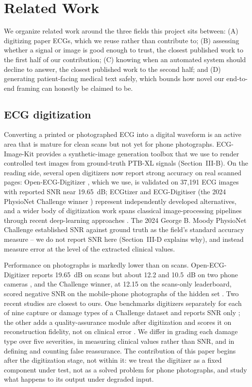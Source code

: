 \documentclass[conference]{IEEEtran}
\begin{document}
\section{Related Work}

We organize related work around the three fields this project sits between: (A)
digitizing paper ECGs, which we reuse rather than contribute to; (B) assessing
whether a signal or image is good enough to trust, the closest published work to the
first half of our contribution; (C) knowing when an automated system should decline
to answer, the closest published work to the second half; and (D) generating
patient-facing medical text safely, which bounds how novel our end-to-end framing can
honestly be claimed to be.

\subsection{ECG digitization}

Converting a printed or photographed ECG into a digital waveform is an active area
that is mature for clean scans but not yet for phone photographs. ECG-Image-Kit \cite{ref1} provides a synthetic-image
generation toolbox that we use to render controlled test images from ground-truth
PTB-XL signals (Section~III-B). On the reading side, several open digitizers now
report strong accuracy on real scanned pages: Open-ECG-Digitizer \cite{ref5}, which we
use, is validated on 37{,}191 ECG images with reported SNR near 19.65~dB;
ECGtizer \cite{ref3} and ECG-Digitiser (the 2024 PhysioNet Challenge
winner \cite{ref53}) represent independently developed alternatives, and a wider
body of digitization work spans classical image-processing
pipelines \cite{ref6,ref7,ref8,ref9} through recent deep-learning
approaches \cite{ref10,ref11}. The 2024 George B. Moody PhysioNet Challenge
established SNR against ground truth as the field's standard accuracy
measure \cite{ref2,ref4} -- we do not report SNR here (Section~III-D explains why),
and instead measure error at the level of the extracted clinical values.

Performance on photographs is markedly lower than on scans. Open-ECG-Digitizer
reports 19.65~dB on scans but about 12.2 and 10.5~dB on two phone cameras
\cite{ref5}, and the Challenge winner, at 12.15 on the scans-only leaderboard,
scored negative SNR on the mobile-phone photographs of the hidden set
\cite{ref53}. Two recent studies are closest to ours. One benchmarks digitizers
separately for each of nine capture or damage types of a Challenge dataset and
reports SNR only \cite{ref54}; the other adds a quality-assurance module after
digitization and scores it on reconstruction fidelity, not on clinical
error \cite{ref55}. We differ in grading each damage type over five severities, in
measuring clinical values rather than SNR, and in defining and counting false
reassurance. The contribution of this paper begins after the digitization stage,
not within it: we treat the digitizer as a fixed component under test, not as a
solved problem for phone photographs, and study what happens to its output under
degraded input.
\end{document}
